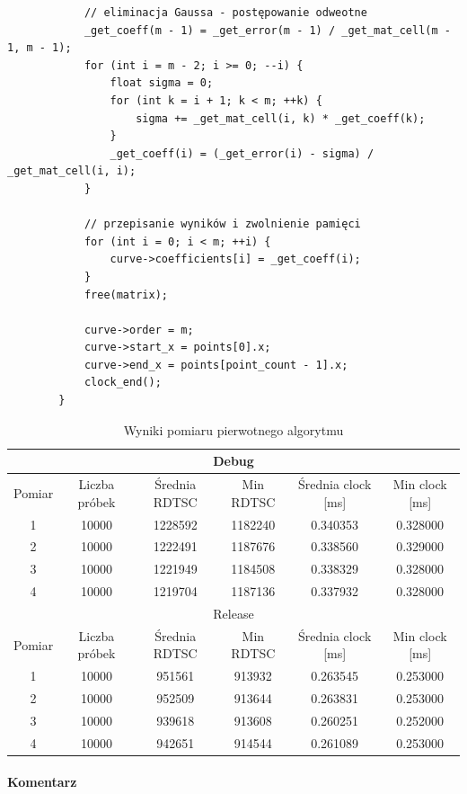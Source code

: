 \documentclass[12pt]{report}
\begin{document}
\begin{verbatim}
			// eliminacja Gaussa - postępowanie odweotne
			_get_coeff(m - 1) = _get_error(m - 1) / _get_mat_cell(m - 1, m - 1);
			for (int i = m - 2; i >= 0; --i) {
				float sigma = 0;
				for (int k = i + 1; k < m; ++k) {
					sigma += _get_mat_cell(i, k) * _get_coeff(k);
				}
				_get_coeff(i) = (_get_error(i) - sigma) / _get_mat_cell(i, i);
			}
			
			// przepisanie wyników i zwolnienie pamięci
			for (int i = 0; i < m; ++i) {
				curve->coefficients[i] = _get_coeff(i);
			}
			free(matrix);
			
			curve->order = m;
			curve->start_x = points[0].x;
			curve->end_x = points[point_count - 1].x;
			clock_end();
		}
	\end{verbatim}

	\pagebreak	
	\begin{table}[H]
		\centering
		\caption{Wyniki pomiaru pierwotnego algorytmu}
		\begin{tabular}{|c|c|c|c|c|c|} \hline
			\multicolumn{6}{|c|}{Debug} \\\hline
			Pomiar  & Liczba próbek & Średnia RDTSC & Min RDTSC & Średnia clock [ms] & Min clock [ms] \\\hline
			1 & 10000 & 1228592 & 1182240 & 0.340353 & 0.328000 \\\hline
			2 & 10000 & 1222491 & 1187676 & 0.338560 & 0.329000 \\\hline
			3 & 10000 & 1221949 & 1184508 & 0.338329 & 0.328000 \\\hline
			4 & 10000 & 1219704 & 1187136 & 0.337932 & 0.328000 \\\hline
			\hline
			\multicolumn{6}{|c|}{Release} \\\hline
			Pomiar  & Liczba próbek & Średnia RDTSC & Min RDTSC & Średnia clock [ms] & Min clock [ms] \\\hline
			1 & 10000 & 951561 & 913932 & 0.263545 & 0.253000 \\\hline
			2 & 10000 & 952509 & 913644 & 0.263831 & 0.253000 \\\hline
			3 & 10000 & 939618 & 913608 & 0.260251 & 0.252000 \\\hline
			4 & 10000 & 942651 & 914544 & 0.261089 & 0.253000 \\\hline
		\end{tabular}
	\end{table}
	
	\paragraph{Komentarz}
\end{document}
